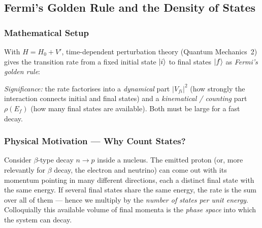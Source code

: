 
\subsection{Fermi's Golden Rule and the Density of States}
\label{subsec:lec08:fgr}

\subsubsection*{Mathematical Setup}
With $H = H_0 + V'$, time-dependent perturbation theory (Quantum Mechanics~2)
gives the transition rate from a fixed initial state $\ket{i}$ to final states
$\ket{f}$ as \emph{Fermi's golden rule}:

\textit{Significance:} the rate factorises into a \emph{dynamical} part
$|V_{fi}|^2$ (how strongly the interaction connects initial and final states)
and a \emph{kinematical / counting} part $\rho(E_f)$ (how many final states are
available).  Both must be large for a fast decay.


\subsubsection*{Physical Motivation --- Why Count States?}
Consider $\beta$-type decay $n\to p$ inside a nucleus.  The emitted proton (or,
more relevantly for $\beta$ decay, the electron and neutrino) can come out with
its momentum pointing in many different directions, each a distinct final state
with the same energy.  If several final states share the same energy, the rate
is the sum over all of them --- hence we multiply by the \emph{number of states
per unit energy}.  Colloquially this available volume of final momenta is the
\emph{phase space} into which the system can decay.

